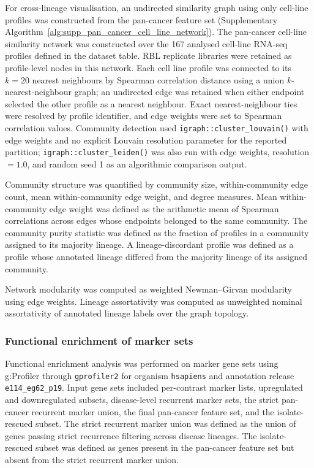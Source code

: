 For cross-lineage visualisation, an undirected similarity graph using only
cell-line profiles was constructed from the pan-cancer feature set (Supplementary
Algorithm~\ref{alg:supp_pan_cancer_cell_line_network}).
The pan-cancer cell-line similarity network was constructed over the 167
analysed cell-line RNA-seq profiles defined in the dataset table. RBL replicate
libraries were retained as profile-level nodes in this network.
Each cell line profile was connected to its \(k = 20\) nearest neighbours by
Spearman correlation distance using a union \(k\)-nearest-neighbour graph; an
undirected edge was retained when either endpoint selected the other profile as
a nearest neighbour. Exact nearest-neighbour ties were resolved by profile
identifier, and edge weights were set to Spearman correlation values. Community
detection used \texttt{igraph::cluster\_louvain()} with edge weights and no
explicit Louvain resolution parameter for the reported partition;
\texttt{igraph::cluster\_leiden()} was also run with edge weights, resolution
\(=1.0\), and random seed 1 as an algorithmic comparison output.

Community structure was quantified by community size, within-community edge
count, mean within-community edge weight, and degree measures. Mean
within-community edge weight was defined as the arithmetic mean of Spearman
correlations across edges whose endpoints belonged to the same community.
The community purity statistic was defined as the fraction of profiles in a community assigned
to its majority lineage. A lineage-discordant profile was defined as a profile
whose annotated lineage differed from the majority lineage of its assigned
community.

Network modularity was computed as weighted Newman--Girvan modularity using
edge weights. Lineage assortativity was computed as unweighted nominal
assortativity of annotated lineage labels over the graph topology.

\subsubsection{Functional enrichment of marker sets}

Functional enrichment analysis was performed on marker gene sets using
g:Profiler through \texttt{gprofiler2} for organism \texttt{hsapiens} and
annotation release \texttt{e114\_eg62\_p19}. Input gene sets included
per-contrast marker lists, upregulated and downregulated subsets, disease-level
recurrent marker sets, the strict pan-cancer recurrent marker union, the final
pan-cancer feature set, and the isolate-rescued subset. The strict recurrent
marker union was defined as the union of genes passing strict recurrence
filtering across disease lineages. The isolate-rescued subset was defined as
genes present in the pan-cancer feature set but absent from the strict recurrent
marker union.

